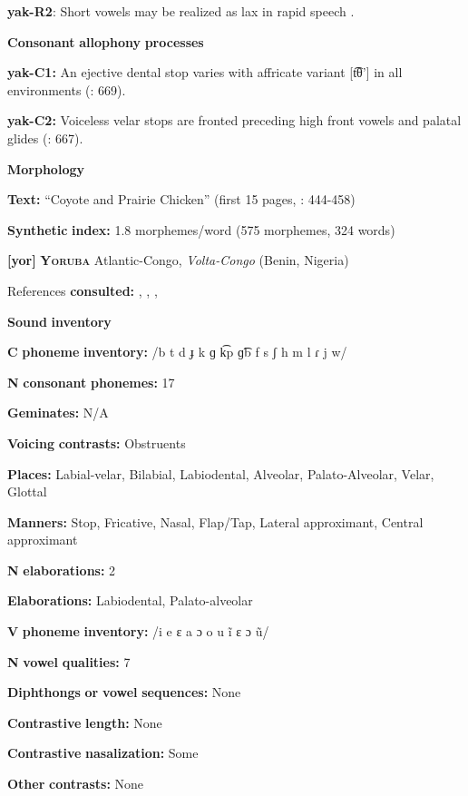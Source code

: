 \begin{styleBody}
\textbf{yak-R2}: Short vowels may be realized as lax in rapid speech \citep[40]{Jansen2010}.

\textbf{Consonant} \textbf{allophony} \textbf{processes}

\textbf{yak-C1:} An ejective dental stop varies with affricate variant [t͡θ’] in all environments (\citealt{RigsbyRude1996}: 669).

\textbf{yak-C2:} Voiceless velar stops are fronted preceding high front vowels and palatal glides (\citealt{RigsbyRude1996}: 667).

\textbf{Morphology}

\textbf{Text:} “Coyote and Prairie Chicken” (first 15 pages, \citealt{Jansen2010}: 444-458)

\textbf{Synthetic} \textbf{index:} 1.8 morphemes/word (575 morphemes, 324 words)

\textbf{[yor]}   \textbf{\textsc{Yoruba}}  Atlantic-Congo, \textit{Volta-Congo} (Benin, Nigeria)

References \textbf{consulted:} \citet{Bamgbose1966}, \citet{Rowlands1969}, \citet{Seidl2000}, \citet{Siertsema1959}

\textbf{Sound} \textbf{inventory}

\textbf{C} \textbf{phoneme} \textbf{inventory:} /b t d ɟ k ɡ k͡p ɡ͡b f s ʃ h m l ɾ j w/

\textbf{N} \textbf{consonant} \textbf{phonemes:} 17

\textbf{Geminates:} N/A

\textbf{Voicing} \textbf{contrasts:} Obstruents

\textbf{Places:} Labial-velar, Bilabial, Labiodental, Alveolar, Palato-Alveolar, Velar, Glottal

\textbf{Manners:} Stop, Fricative, Nasal, Flap/Tap, Lateral approximant, Central approximant

\textbf{N} \textbf{elaborations:} 2

\textbf{Elaborations:} Labiodental, Palato-alveolar

\textbf{V} \textbf{phoneme} \textbf{inventory:} /i e ɛ a ɔ o u ĩ ɛ ɔ ũ/

\textbf{N} \textbf{vowel} \textbf{qualities:} 7

\textbf{Diphthongs} \textbf{or} \textbf{vowel} \textbf{sequences:} None

\textbf{Contrastive} \textbf{length:} None

\textbf{Contrastive} \textbf{nasalization:} Some

\textbf{Other} \textbf{contrasts:} None


\end{styleBody}
